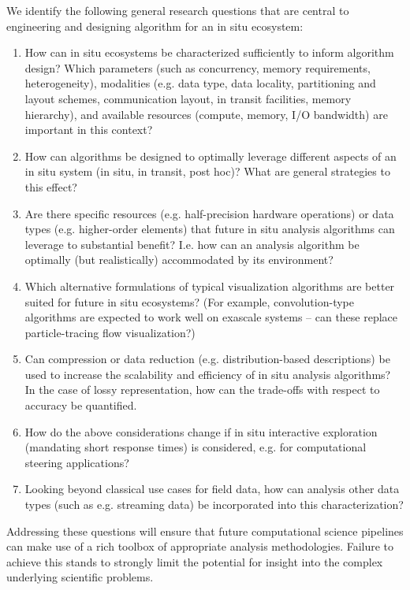 We identify the following general research questions that are central to engineering and designing algorithm for an in situ ecosystem:
\begin{enumerate}
\item How can in situ ecosystems be characterized sufficiently to inform algorithm design? Which parameters (such as concurrency, memory requirements, heterogeneity), modalities (e.g. data type, data locality, partitioning and layout schemes, communication layout, in transit facilities, memory hierarchy), and available resources (compute, memory, I/O bandwidth) are important in this context?
\item How can algorithms be designed to optimally leverage different aspects of an in situ system (in situ, in transit, post hoc)? What are general strategies to this effect?
\item Are there specific resources (e.g. half-precision hardware operations) or data types (e.g. higher-order elements) that future in situ analysis algorithms can leverage to substantial benefit? I.e. how can an analysis algorithm be optimally (but realistically) accommodated by its environment?
\item Which alternative formulations of typical visualization algorithms are better suited for future in situ ecosystems? (For example, convolution-type algorithms are expected to work well on exascale systems – can these replace particle-tracing flow visualization?)
\item Can compression or data reduction (e.g. distribution-based descriptions) be used to increase the scalability and efficiency of in situ analysis algorithms? In the case of lossy representation, how can the trade-offs with respect to accuracy be quantified.
\item How do the above considerations change if in situ interactive exploration (mandating short response times)  is considered, e.g. for computational steering applications?
\item Looking beyond classical use cases for field data, how can analysis other data types (such as e.g. streaming data) be incorporated into this characterization?
\end{enumerate}

 Addressing these questions will ensure that future computational science pipelines can make use of a rich toolbox of appropriate analysis methodologies. Failure to achieve this stands to strongly limit the potential for insight into the complex underlying scientific problems.

